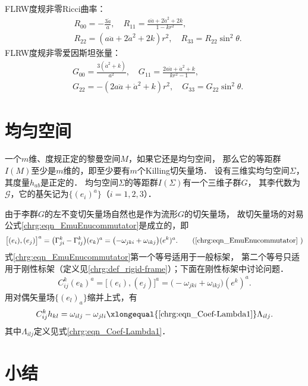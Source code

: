 FLRW度规非零Ricci曲率：
\begin{subequations}\label{chcos:eqn_FLRW-Ricci}
	\begin{align}
		&R_{00} = -\frac{3 \ddot{a}}{a} ,\quad 
		R_{11} = \frac{a \ddot{a}+2 \dot{a}^2+2 k}{1-k r^2} , \\
		&R_{22} = \left(a \ddot{a}+2 \dot{a}^2+2 k\right) r^2 , \quad
		R_{33} = R_{22} \sin ^2\theta.
	\end{align}
\end{subequations}
FLRW度规非零爱因斯坦张量：
\begin{subequations}\label{chcos:eqn_FLRW-G}
	\begin{align}
		&G_{00} = \frac{3 \left(\dot{a}^2+k\right)}{a^2} ,\quad 
		G_{11} = \frac{2 a \ddot{a}+\dot{a}^2+k}{k r^2-1} ,\\
		&G_{22} = - \left(2 a \ddot{a}+\dot{a}^2+k\right) r^2 , \quad
		G_{33} = G_{22} \sin ^2\theta.
	\end{align}
\end{subequations}





\section{均匀空间}

一个$m$维、度规正定的黎曼空间$M$，如果它还是均匀空间，
那么它的等距群$I(M)$至少是$m$维的，即至少要有$m$个Killing切矢量场．
设有三维实均匀空间$\Sigma$，其度量$h_{ab}$是正定的．
均匀空间$\Sigma$的等距群$I(\Sigma)$有一个三维子群$G$，
其李代数为$\mathscr{G}$，它的基矢记为$\{(e_i)^a\}$（$i=1,2,3$）．

由于李群$G$的左不变切矢量场自然也是作为流形$G$的切矢量场，
故切矢量场的对易公式\eqref{chrg:eqn_EmuEnucommutator}是成立的，即
\begin{align}
	\bigl[(e_i), (e_j)\bigr]^a
	= \bigl(\Gamma^{k}_{ji} - \Gamma^{k}_{ij}\bigr) (e_k)^a
	= \bigl(-\omega_{jki} + \omega_{ikj}\bigr) (e^k)^a .
	\tag{\ref{chrg:eqn_EmuEnucommutator} }
\end{align}
式\eqref{chrg:eqn_EmuEnucommutator}第一个等号适用于一般标架，
第二个等号只适用于刚性标架（定义见\ref{chrg:def_rigid-frame}）；下面在刚性标架中讨论问题．
\begin{align*}
	C^k_{ij} (e_k)^a = \bigl[(e_i), (e_j)\bigr]^a
	= \bigl(-\omega_{jki} + \omega_{ikj}\bigr) (e^k)^a  .
\end{align*}
用对偶矢量场$\{(e_l)_a\}$缩并上式，有
\begin{equation}
	C^k_{ij} h_{kl}= \omega_{ilj} -\omega_{jli}
	\xlongequal{\ref{chrg:eqn_Coef-Lambda1}} \Lambda_{ilj} .
\end{equation}
其中$\Lambda_{il j}$定义见式\eqref{chrg:eqn_Coef-Lambda1}．





\section*{小结}

\printbibliography[heading=subbibliography,title=第\ref{chcos}章参考文献]

\endinput
